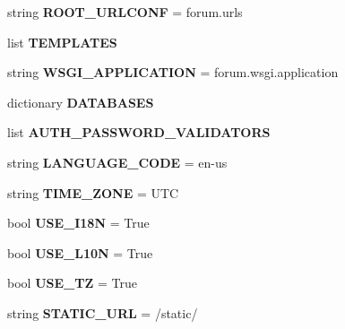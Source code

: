 \begin{DoxyCompactItemize}
\item 
\mbox{\label{namespaceforum_1_1settings_a8fd5d43ea511624c2f509e10f7b25eae}} 
string {\bfseries R\+O\+O\+T\+\_\+\+U\+R\+L\+C\+O\+NF} = \textquotesingle{}forum.\+urls\textquotesingle{}
\item 
list {\bfseries T\+E\+M\+P\+L\+A\+T\+ES}
\item 
\mbox{\label{namespaceforum_1_1settings_adc17c155262b17526a525779bef2e01d}} 
string {\bfseries W\+S\+G\+I\+\_\+\+A\+P\+P\+L\+I\+C\+A\+T\+I\+ON} = \textquotesingle{}forum.\+wsgi.\+application\textquotesingle{}
\item 
dictionary {\bfseries D\+A\+T\+A\+B\+A\+S\+ES}
\item 
list {\bfseries A\+U\+T\+H\+\_\+\+P\+A\+S\+S\+W\+O\+R\+D\+\_\+\+V\+A\+L\+I\+D\+A\+T\+O\+RS}
\item 
\mbox{\label{namespaceforum_1_1settings_a5f1c3ff72d1d295996227a68ca504679}} 
string {\bfseries L\+A\+N\+G\+U\+A\+G\+E\+\_\+\+C\+O\+DE} = \textquotesingle{}en-\/us\textquotesingle{}
\item 
\mbox{\label{namespaceforum_1_1settings_a52847811be67a2ac71da806ac15951e2}} 
string {\bfseries T\+I\+M\+E\+\_\+\+Z\+O\+NE} = \textquotesingle{}U\+TC\textquotesingle{}
\item 
\mbox{\label{namespaceforum_1_1settings_ab8f650ff9b47a1a1c76084bfbdb77c38}} 
bool {\bfseries U\+S\+E\+\_\+\+I18N} = True
\item 
\mbox{\label{namespaceforum_1_1settings_a120ae7e897e5909b2cfb1a651382e8bf}} 
bool {\bfseries U\+S\+E\+\_\+\+L10N} = True
\item 
\mbox{\label{namespaceforum_1_1settings_a1536607be4b98261cd0fd737728dd438}} 
bool {\bfseries U\+S\+E\+\_\+\+TZ} = True
\item 
\mbox{\label{namespaceforum_1_1settings_a52e4ff46e00c7ec8ec42b5db7f2a3290}} 
string {\bfseries S\+T\+A\+T\+I\+C\+\_\+\+U\+RL} = \textquotesingle{}/static/\textquotesingle{}
\end{DoxyCompactItemize}



